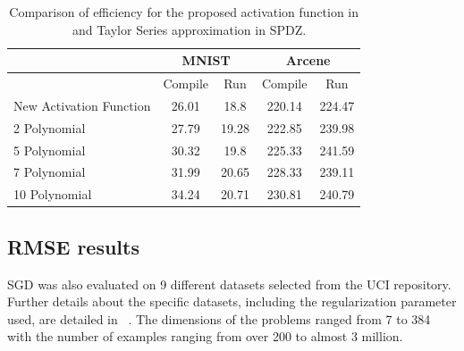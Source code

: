 \documentclass{article}
\begin{document}
\begin{table}[h]
\centering
\label{my-label}
\caption{Comparison of efficiency for the proposed activation function in ~\cite{MZ17} and Taylor Series approximation in SPDZ.}
\begin{tabular}{@{}lcccc@{}}
\toprule
                        & \multicolumn{2}{c}{MNIST} & \multicolumn{2}{c}{Arcene} \\ \midrule
                        & Compile      & Run        & Compile      & Run         \\
New Activation Function & 26.01        & 18.8       & 220.14       & 224.47      \\
2 Polynomial            & 27.79        & 19.28      & 222.85       & 239.98      \\
5 Polynomial            & 30.32        & 19.8       & 225.33       & 241.59      \\
7 Polynomial            & 31.99        & 20.65      & 228.33       & 239.11      \\
10 Polynomial           & 34.24        & 20.71      & 230.81       & 240.79      \\ \bottomrule
\end{tabular}
\label{tbl2}
\end{table}


\newpage
\subsection{RMSE results}

SGD was also evaluated on 9 different datasets selected from the UCI repository. Further details about the specific datasets, including the regularization parameter used, are detailed in ~\cite{GSB0DZE17}. The dimensions of the problems ranged from 7 to 384 with the number of examples ranging from over 200 to almost 3 million.
\end{document}
